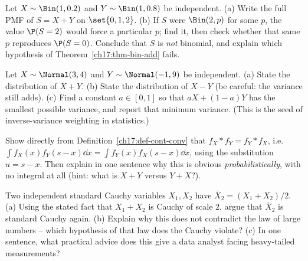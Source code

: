 \begin{exercise}
\label{ch17:ex-difp}
Let $X\sim\Bin(1,0.2)$ and $Y\sim\Bin(1,0.8)$ be independent.
(a) Write the full PMF of $S=X+Y$ on $\set{0,1,2}$.
(b) If $S$ were $\Bin(2,p)$ for some $p$, the value $\P(S=2)$ would force a
particular $p$; find it, then check whether that same $p$ reproduces
$\P(S=0)$. Conclude that $S$ is \emph{not} binomial, and explain which
hypothesis of Theorem~\ref{ch17:thm-bin-add} fails.
\end{exercise}

\begin{exercise}
\label{ch17:ex-normal}
Let $X\sim\Normal(3,4)$ and $Y\sim\Normal(-1,9)$ be independent.
(a) State the distribution of $X+Y$.
(b) State the distribution of $X-Y$ (be careful: the variance still adds).
(c) Find a constant $a\in[0,1]$ so that $aX+(1-a)Y$ has the smallest
possible variance, and report that minimum variance. (This is the seed of
inverse-variance weighting in statistics.)
\end{exercise}

\begin{exercise}
\label{ch17:ex-commute}
Show directly from Definition~\ref{ch17:def-cont-conv} that
$f_X*f_Y=f_Y*f_X$, i.e.\ $\int f_X(x)f_Y(s-x)\dd x=\int f_Y(x)f_X(s-x)\dd x$,
using the substitution $u=s-x$. Then explain in one sentence why this is
obvious \emph{probabilistically}, with no integral at all (hint: what is
$X+Y$ versus $Y+X$?).
\end{exercise}

\begin{exercise}
\label{ch17:ex-cauchy}
Two independent standard Cauchy variables $X_1,X_2$ have
$\bar X_2=(X_1+X_2)/2$.
(a) Using the stated fact that $X_1+X_2$ is Cauchy of scale $2$, argue that
$\bar X_2$ is standard Cauchy again.
(b) Explain why this does not contradict the law of large numbers --
which hypothesis of that law does the Cauchy violate?
(c) In one sentence, what practical advice does this give a data analyst
facing heavy-tailed measurements?
\end{exercise}
